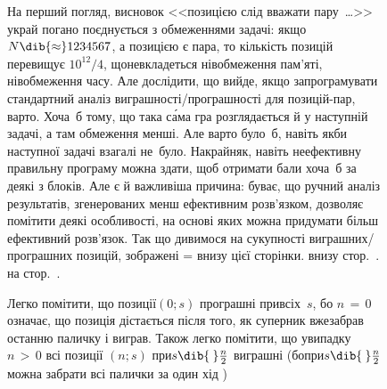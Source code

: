 \begin{figure}[!b]
\begin{figure}[p]
\begin{sffamily}
\begin{small}
\noindent%
\ifAfour

\else

\fi
\end{small}

\label{fig:stick-with-spec-moves-positions}


\ifglobalsf
\end{sffamily}
\fi
\end{figure}

На перший погляд, висновок <<позицією слід вважати пару~\dots>> украй погано поєднується з обмеженнями задачі: якщо $N\dib{{\approx}}1234567$, а позицією є пара, то кількість позицій перевищує $10^{12}/{4}$, що\nolinebreak[2] %
не\nolinebreak[3] вкладеться ні\nolinebreak[3] в\nolinebreak[3] обмеження пам'яті, ні\nolinebreak[3] в\nolinebreak[3] обмеження часу.
%
Але дослідити, що вийде, якщо запрограмувати стандартний аналіз виграшності/програшності для позицій-пар, %
варто. 
Хоча~б тому, що така с\'{а}ма гра розглядається й у наступній задачі, а там обмеження %
менші. Але варто було~б, навіть якби наступної задачі взагалі не~було. 
Накрайняк, навіть неефективну правильну програму можна здати, щоб отримати бали хоча~б за деякі з блоків. 
Але є й важливіша причина:
буває, що ручний аналіз результатів, згенерованих менш ефективним розв'язком, дозволяє помітити деякі особливості, на основі яких можна придумати більш ефективний розв'язок. Так що дивимося на сукупності виграшних/програшних позицій, зображені\label{text:link-to-fig-stick-with-spec-moves-positions} 
\ifAfour
\ifnum{}=
внизу цієї сторінки.
\else
внизу стор.~\pageref{fig:stick-with-spec-moves-positions}.
\fi
\else
на стор.~\pageref{fig:stick-with-spec-moves-positions}.
\fi

Легко помітити, що позиції\nolinebreak[3] $(0;s)$ програшні при\nolinebreak[2] всіх~$s$, бо ${n\,{=}\,0}$ означає, що позиція дістається %
після того, як суперник вже\nolinebreak[3] забрав останню паличку і виграв. Також легко помітити, що у\nolinebreak[3] випадку\nolinebreak[3] ${n\,{>}\,0}$ всі позиції $(n;s)$ при\nolinebreak[3] $s\dib{{\>}}\frac{n}{2}$ виграшні (бо\nolinebreak[3] при\nolinebreak[3] $s\dib{{\>}}\frac{n}{2}$ можна забрати всі палички за один хід%
)


\end{figure}
